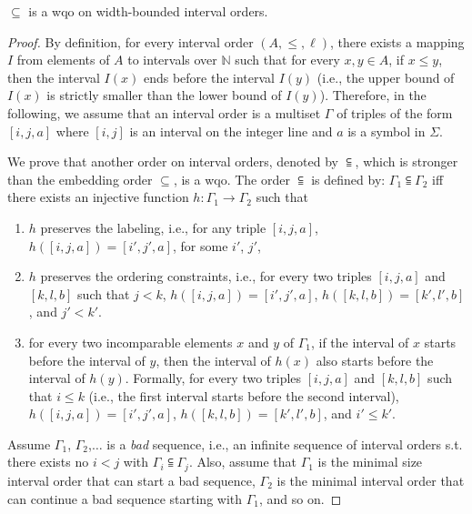 \begin{lemma}
$\subseteq$ is a wqo on width-bounded interval orders.
\end{lemma}
\begin{proof}
By definition, for every interval order $(A,\leq,\ell)$, there exists a mapping $I$ from elements of $A$ to intervals over $\mathbb{N}$ such that for every $x,y\in A$, if $x\leq y$, then the interval $I(x)$ ends before the interval $I(y)$ (i.e., the upper bound of $I(x)$ is strictly smaller than the lower bound of $I(y)$). %
Therefore, in the following, we assume that an interval order is a multiset $\Gamma$ of triples of the form $[i,j,a]$ where $[i,j]$ is an interval on the integer line and $a$ is a symbol in $\Sigma$.

We prove that another order on interval orders, denoted by $\subseteqq$, which is stronger than the embedding order $\subseteq$, is a wqo. The order $\subseteqq$ is defined by: $\Gamma_1\subseteqq \Gamma_2$ iff there exists an injective function $h:\Gamma_1\rightarrow \Gamma_2$ such that 
\begin{enumerate}
	\item $h$ preserves the labeling, i.e., for any triple $[i,j,a]$, $h([i,j,a])=[i',j',a]$, for some $i'$, $j'$, 
	\item $h$ preserves the ordering constraints, i.e., for every two triples $[i,j,a]$ and $[k,l,b]$ such that $j< k$, $h([i,j,a])=[i',j',a]$, $h([k,l,b])=[k',l',b]$, and $j'< k'$.
	\item for every two incomparable elements $x$ and $y$ of $\Gamma_1$, if the interval of $x$ starts before the interval of $y$, then the interval of $h(x)$ also starts before the interval of $h(y)$. Formally, for every two triples $[i,j,a]$ and $[k,l,b]$ such that $i\leq k$ (i.e., the first interval starts before the second interval), $h([i,j,a])=[i',j',a]$, $h([k,l,b])=[k',l',b]$, and $i'\leq k'$.
\end{enumerate}
		
Assume $\Gamma_1$, $\Gamma_2$,$\ldots$ is a \emph{bad} sequence, i.e., an infinite sequence of interval orders s.t. there exists no $i < j$ with $\Gamma_i\subseteqq \Gamma_j$. Also, assume that $\Gamma_1$ is the minimal size interval order that can start a bad sequence, $\Gamma_2$ is the minimal interval order that can continue a bad sequence starting with $\Gamma_1$, and so on.


\end{proof}
